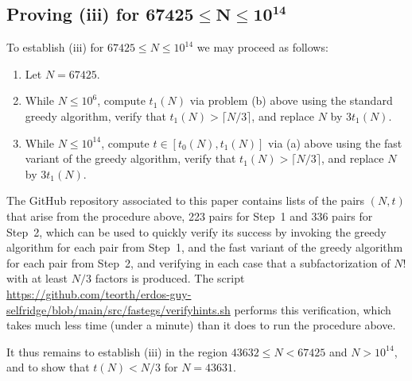 \documentclass[10pt,a4paper,reqno]{amsart}
\numberwithin{equation}{section}
\theoremstyle{plain}
\theoremstyle{definition}
\begin{document}
\subsection{Proving \texorpdfstring{}{Theorem 1.3}(iii) for \texorpdfstring{$\boldsymbol{67425 \le N \le 10^{14}}$}{67425 <= N <= 1e14}}
To establish (iii) for $67425 \leq N \leq 10^{14}$ we may proceed as follows:
\begin{enumerate}
\item[Step 0:] Let $N=67425$.
\item[Step 1:] While $N\le 10^6$, compute $t_1(N)$ via problem (b) above using the standard greedy algorithm, verify that $t_1(N) > \lceil N/3\rceil$, and replace $N$ by $3t_1(N)$.
\item[Step 2:] While $N\le 10^{14}$, compute $t\in [t_0(N),t_1(N)]$ via (a) above using the fast variant of the greedy algorithm, verify that $t_1(N) > \lceil N/3\rceil$, and replace $N$ by $3t_1(N)$.
\end{enumerate}
The GitHub repository \cite{github} associated to this paper contains lists of the pairs $(N,t)$ that arise from the procedure above, 223 pairs for Step~1 and 336 pairs for Step~2, which can be used to quickly verify its success by invoking the greedy algorithm for each pair from Step~1, and the fast variant of the greedy algorithm for each pair from Step~2, and verifying in each case that a subfactorization of $N!$ with at least $N/3$ factors is produced.  The script \url{https://github.com/teorth/erdos-guy-selfridge/blob/main/src/fastegs/verifyhints.sh} performs this verification, which takes much less time (under a minute) than it does to run the procedure above.

It thus remains to establish (iii) in the region $43632 \leq N < 67425$ and $N > 10^{14}$, and to show that $t(N)<N/3$ for $N=43631$.
\end{document}
